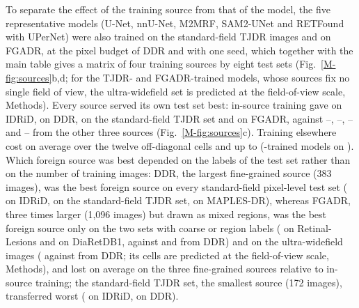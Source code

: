 To separate the effect of the training source from that of the model, the five representative models (U-Net, nnU-Net, M2MRF, SAM2-UNet and RETFound with UPerNet) were also trained on the standard-field TJDR images and on FGADR, at the pixel budget of DDR and with one seed, which together with the main table gives a matrix of four training sources by eight test sets (Fig.~\ref{M-fig:sources}b,d; for the TJDR- and FGADR-trained models, whose sources fix no single field of view, the ultra-widefield set is predicted at the field-of-view scale, Methods). Every source served its own test set best: in-source training gave  \mAUPR{} on IDRiD,  on DDR,  on the standard-field TJDR set and  on FGADR, against --, --, -- and -- from the other three sources (Fig.~\ref{M-fig:sources}c). Training elsewhere cost  \mAUPR{} on average over the twelve off-diagonal cells and up to  (-trained models on ). Which foreign source was best depended on the labels of the test set rather than on the number of training images: DDR, the largest fine-grained source (383 images), was the best foreign source on every standard-field pixel-level test set ( on IDRiD,  on the standard-field TJDR set,  on MAPLES-DR), whereas FGADR, three times larger (1,096 images) but drawn as mixed regions, was the best foreign source only on the two sets with coarse or region labels ( on Retinal-Lesions and  on DiaRetDB1, against  and  from DDR) and on the ultra-widefield images ( against  from DDR; its cells are predicted at the field-of-view scale, Methods), and lost  on average on the three fine-grained sources relative to in-source training; the standard-field TJDR set, the smallest source (172 images), transferred worst ( on IDRiD,  on DDR).

